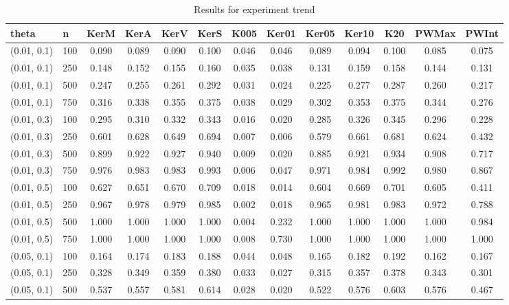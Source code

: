   
  \begin{table}[ht]
  	\centering
  	
  	\caption{Results for experiment trend}
  	\tiny{
  		\begin{tabular}{ll|ccccccccccc}
  			\hline
  			theta & n & KerM & KerA & KerV & KerS & K005 & Ker01 & Ker05 & Ker10 & K20 & PWMax & PWInt \\
  			\hline
  			(0.01, 0.1) & 100 & 0.090 & 0.089 & 0.090 & 0.100 & 0.046 & 0.046 & 0.089 & 0.094 & 0.100 & 0.085 & 0.075 \\
  			(0.01, 0.1) & 250 & 0.148 & 0.152 & 0.155 & 0.160 & 0.035 & 0.038 & 0.131 & 0.159 & 0.158 & 0.144 & 0.131 \\
  			(0.01, 0.1) & 500 & 0.247 & 0.255 & 0.261 & 0.292 & 0.031 & 0.024 & 0.225 & 0.277 & 0.287 & 0.260 & 0.217 \\
  			(0.01, 0.1) & 750 & 0.316 & 0.338 & 0.355 & 0.375 & 0.038 & 0.029 & 0.302 & 0.353 & 0.375 & 0.344 & 0.276 \\
  			(0.01, 0.3) & 100 & 0.295 & 0.310 & 0.332 & 0.343 & 0.016 & 0.020 & 0.285 & 0.326 & 0.345 & 0.296 & 0.228 \\
  			(0.01, 0.3) & 250 & 0.601 & 0.628 & 0.649 & 0.694 & 0.007 & 0.006 & 0.579 & 0.661 & 0.681 & 0.624 & 0.432 \\
  			(0.01, 0.3) & 500 & 0.899 & 0.922 & 0.927 & 0.940 & 0.009 & 0.020 & 0.885 & 0.921 & 0.934 & 0.908 & 0.717 \\
  			(0.01, 0.3) & 750 & 0.976 & 0.983 & 0.983 & 0.993 & 0.006 & 0.047 & 0.971 & 0.984 & 0.992 & 0.980 & 0.867 \\
  			(0.01, 0.5) & 100 & 0.627 & 0.651 & 0.670 & 0.709 & 0.018 & 0.014 & 0.604 & 0.669 & 0.701 & 0.605 & 0.411 \\
  			(0.01, 0.5) & 250 & 0.967 & 0.978 & 0.979 & 0.985 & 0.002 & 0.018 & 0.965 & 0.981 & 0.983 & 0.972 & 0.788 \\
  			(0.01, 0.5) & 500 & 1.000 & 1.000 & 1.000 & 1.000 & 0.004 & 0.232 & 1.000 & 1.000 & 1.000 & 1.000 & 0.984 \\
  			(0.01, 0.5) & 750 & 1.000 & 1.000 & 1.000 & 1.000 & 0.008 & 0.730 & 1.000 & 1.000 & 1.000 & 1.000 & 1.000 \\
  			(0.05, 0.1) & 100 & 0.164 & 0.174 & 0.183 & 0.188 & 0.044 & 0.048 & 0.165 & 0.182 & 0.192 & 0.162 & 0.167 \\
  			(0.05, 0.1) & 250 & 0.328 & 0.349 & 0.359 & 0.380 & 0.033 & 0.027 & 0.315 & 0.357 & 0.378 & 0.343 & 0.301 \\
  			(0.05, 0.1) & 500 & 0.537 & 0.557 & 0.581 & 0.614 & 0.028 & 0.020 & 0.522 & 0.576 & 0.603 & 0.576 & 0.467 \\

\end{tabular}}
\end{table}
